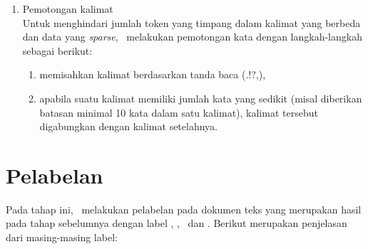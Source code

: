 \begin{enumerate}
	\item Pemotongan kalimat\\
	Untuk menghindari jumlah token yang timpang dalam kalimat yang berbeda dan data yang \textit{sparse}, \saya~melakukan pemotongan kata dengan langkah-langkah sebagai berikut:
	\begin{enumerate}
		\item memisahkan kalimat berdasarkan tanda baca (.!?,),
		\item apabila suatu kalimat memiliki jumlah kata yang sedikit (misal diberikan batasan minimal 10 kata dalam satu kalimat), kalimat tersebut digabungkan dengan kalimat setelahnya.
	\end{enumerate}
\end{enumerate}

\section{Pelabelan}
Pada tahap ini, \saya~melakukan pelabelan pada dokumen teks yang merupakan hasil pada tahap sebelumnya dengan label \disease, \symptom, \drug~dan \treatment. Berikut merupakan penjelasan dari masing-masing label:
